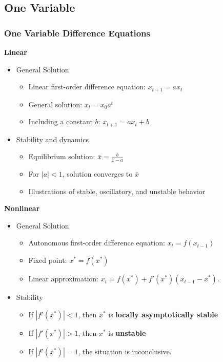 \documentclass[
10pt, %
]{beamer}
\begin{document}
\subsection{One Variable}
\begin{frame}
\frametitle{One Variable Difference Equations}
\textbf{Linear}
\begin{itemize}
    \item General Solution
    \begin{itemize}
    \item Linear first-order difference equation: $x_{t+1} = a x_t$
    \item General solution: $x_t = x_0 a^t$
    \item Including a constant $b$: $x_{t+1} = a x_t + b$
\end{itemize}
    \item Stability and dynamics
    \begin{itemize}
    \item Equilibrium solution: $\bar{x} = \frac{b}{1-a}$
    \item For $|a| < 1$, solution converges to $\bar{x}$
    \item Illustrations of stable, oscillatory, and unstable behavior
\end{itemize}
\end{itemize}
\textbf{Nonlinear}
	\begin{itemize}
		\item General Solution
		\begin{itemize}
    \item Autonomous first-order difference equation: $x_t = f(x_{t-1})$
    \item Fixed point: $x^* = f(x^*)$
    \item Linear approximation: $x_t = f(x^*) + f'(x^*)(x_{t-1} - x^*).$
\end{itemize}
	\item Stability
			\begin{itemize}
			\item If $|f'(x^*)| < 1$, then $x^*$ is \textbf{locally asymptotically stable}
			\item If $|f'(x^*)| > 1$, then $x^*$ is \textbf{unstable}
			\item If $|f'(x^*)| = 1$, the situation is inconclusive.
		\end{itemize}
	\end{itemize}
\end{frame}
\end{document}

